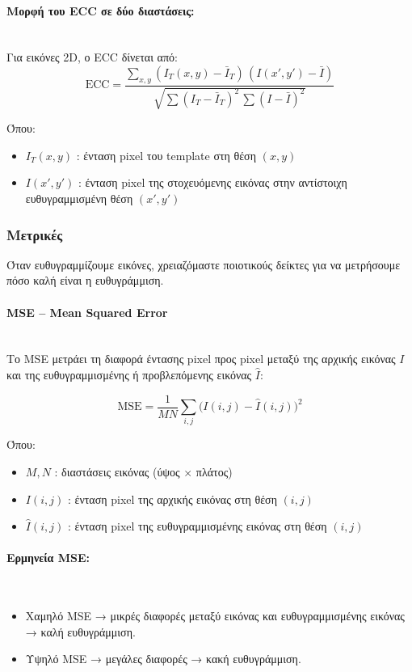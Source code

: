 \documentclass[12pt]{article}
\begin{document}
\paragraph{Μορφή του ECC σε δύο διαστάσεις:}
\mbox{}\\
Για εικόνες 2D, ο ECC δίνεται από:
\begin{equation}
\text{ECC} = 
\frac{
\sum_{x,y} (I_T(x,y) - \bar{I}_T) \, (I(x',y') - \bar{I})
}{
\sqrt{
\sum (I_T - \bar{I}_T)^2 \, \sum (I - \bar{I})^2
}
}
\end{equation}

Όπου:
\begin{itemize}
  \item $I_T(x,y)$ : ένταση pixel του template στη θέση $(x,y)$
  \item $I(x',y')$ : ένταση pixel της στοχευόμενης εικόνας στην αντίστοιχη ευθυγραμμισμένη θέση $(x',y')$
\end{itemize}

\subsubsection{Μετρικές}
Όταν ευθυγραμμίζουμε εικόνες, χρειαζόμαστε ποιοτικούς δείκτες για να μετρήσουμε πόσο καλή είναι η ευθυγράμμιση. 
\paragraph{MSE – Mean Squared Error }
\mbox{}\\
Το MSE μετράει τη διαφορά έντασης pixel προς pixel μεταξύ της αρχικής εικόνας $I$ και της ευθυγραμμισμένης ή προβλεπόμενης εικόνας $\hat{I}$:

\begin{equation}
\text{MSE} = \frac{1}{M N} \sum_{i,j} \big( I(i,j) - \hat{I}(i,j) \big)^2
\end{equation}

Όπου:
\begin{itemize}
  \item $M,N$ : διαστάσεις εικόνας (ύψος × πλάτος)
  \item $I(i,j)$ : ένταση pixel της αρχικής εικόνας στη θέση $(i,j)$
  \item $\hat{I}(i,j)$ : ένταση pixel της ευθυγραμμισμένης εικόνας στη θέση $(i,j)$
\end{itemize}

\paragraph{Ερμηνεία MSE:}
\mbox{}\\
\begin{itemize}
  \item Χαμηλό MSE → μικρές διαφορές μεταξύ εικόνας και ευθυγραμμισμένης εικόνας → καλή ευθυγράμμιση.
  \item Υψηλό MSE → μεγάλες διαφορές → κακή ευθυγράμμιση.
\end{itemize}
\end{document}
